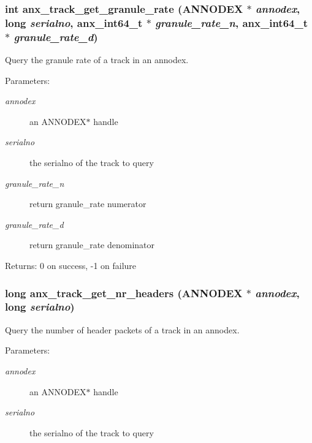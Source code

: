 \subsubsection{\setlength{\rightskip}{0pt plus 5cm}int anx\_\-track\_\-get\_\-granule\_\-rate ({\bf ANNODEX} $\ast$ {\em annodex}, long {\em serialno}, {\bf anx\_\-int64\_\-t} $\ast$ {\em granule\_\-rate\_\-n}, {\bf anx\_\-int64\_\-t} $\ast$ {\em granule\_\-rate\_\-d})}\label{anx__track_8h_a3}


Query the granule rate of a track in an annodex. 

\begin{Desc}
\item[Parameters:]
\begin{description}
\item[{\em annodex}]an ANNODEX$\ast$ handle \item[{\em serialno}]the serialno of the track to query \item[{\em granule\_\-rate\_\-n}]return granule\_\-rate numerator \item[{\em granule\_\-rate\_\-d}]return granule\_\-rate denominator \end{description}
\end{Desc}
\begin{Desc}
\item[Returns:]0 on success, -1 on failure \end{Desc}
\subsubsection{\setlength{\rightskip}{0pt plus 5cm}long anx\_\-track\_\-get\_\-nr\_\-headers ({\bf ANNODEX} $\ast$ {\em annodex}, long {\em serialno})}\label{anx__track_8h_a2}


Query the number of header packets of a track in an annodex. 

\begin{Desc}
\item[Parameters:]
\begin{description}
\item[{\em annodex}]an ANNODEX$\ast$ handle \item[{\em serialno}]the serialno of the track to query \end{description}
\end{Desc}
